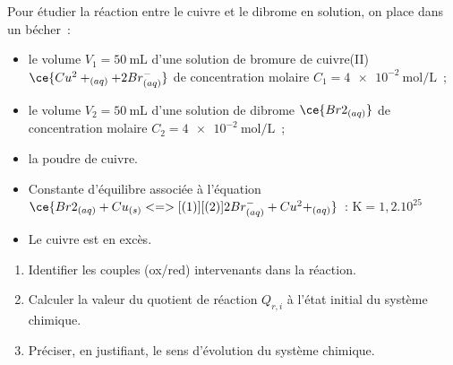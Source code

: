 Pour étudier la réaction entre le cuivre et le dibrome en solution, on place
dans un bécher~:
\begin{itemize}
    \item le volume $V_{1}=\qty{50}{\mL}$ d'une solution de bromure de
          cuivre(II) $\ce{Cu^2+_{(aq)} + 2Br^-_{(aq)}}$ de concentration molaire
          ${C_{1}=\qty{4e-2}{\mol\per\L}}$~;
    \item le volume $V_{2}=\qty{50}{\mL}$ d'une solution de dibrome
          $\ce{Br2_{(aq)}}$ de concentration molaire
          ${C_{2}=\qty{4e-2}{\mol\per\L}}$~;
    \item la poudre de cuivre.
\end{itemize}

\begin{donnees}
    \begin{itemize}
        \item Constante d'équilibre associée à l'équation
              $\ce{Br2_{(aq)} + Cu_{(s)} <=>[(1)][(2)]
              2Br^-_{(aq)} + Cu^2+_{(aq)}}$~: $\mathrm{K}=1,2.10^{25}$
        \item Le cuivre est en excès.
    \end{itemize}
\end{donnees}
\begin{enumerate}
    \item Identifier les couples (ox/red) intervenants dans la réaction.
    \item Calculer la valeur du quotient de réaction $Q_{r,i}$ à l'état initial
          du système chimique.
    \item Préciser, en justifiant, le sens d'évolution du système chimique.
\end{enumerate}



